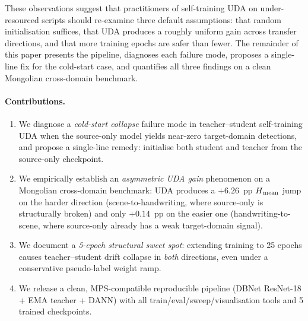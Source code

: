 These observations suggest that practitioners of self-training UDA on
under-resourced scripts should re-examine three default assumptions:
that random initialisation suffices, that UDA produces a roughly
uniform gain across transfer directions, and that more training
epochs are safer than fewer. The remainder of this paper presents the
pipeline, diagnoses each failure mode, proposes a single-line fix for
the cold-start case, and quantifies all three findings on a clean
Mongolian cross-domain benchmark.

\paragraph{Contributions.}
\begin{enumerate}
  \item We diagnose a \emph{cold-start collapse} failure mode in
        teacher--student self-training UDA when the source-only model
        yields near-zero target-domain detections, and propose a
        single-line remedy: initialise both student and teacher from the
        source-only checkpoint.
  \item We empirically establish an \emph{asymmetric UDA gain}
        phenomenon on a Mongolian cross-domain benchmark: UDA produces
        a $+6.26$~pp $H\textsubscript{mean}$ jump on the harder direction
        (scene-to-handwriting, where source-only is structurally
        broken) and only $+0.14$~pp on the easier one
        (handwriting-to-scene, where source-only already has a weak
        target-domain signal).
  \item We document a \emph{5-epoch structural sweet spot}: extending
        training to 25 epochs causes teacher--student drift collapse in
        \emph{both} directions, even under a conservative pseudo-label
        weight ramp.
  \item We release a clean, MPS-compatible reproducible pipeline
        (DBNet ResNet-18 + EMA teacher + DANN) with all
        train/eval/sweep/visualisation tools and 5 trained checkpoints.
\end{enumerate}
